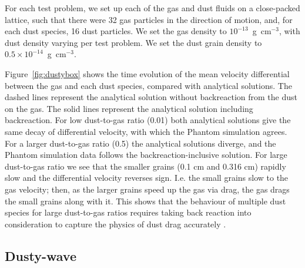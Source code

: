 \documentclass[fleqn,usenatbib]{mnras}
\begin{document}
For each test problem, we set up each of the gas and dust fluids on a
close-packed lattice, such that there were 32 gas particles in the direction of
motion, and, for each dust species, 16 dust particles. We set the gas density to
\(10^{-13}\)~g~cm\({}^{-3}\), with dust density varying per test problem. We set
the dust grain density to \(0.5 \times 10^{-14}\)~g~cm\({}^{-3}\).

Figure~\ref{fig:dustybox} shows the time evolution of the mean velocity
differential between the gas and each dust species, compared with analytical
solutions. The dashed lines represent the analytical solution without
backreaction from the dust on the gas. The solid lines represent the analytical
solution including backreaction. For low dust-to-gas ratio (0.01) both
analytical solutions give the same decay of differential velocity, with which
the Phantom simulation agrees. For a larger dust-to-gas ratio (0.5) the
analytical solutions diverge, and the Phantom simulation data follows the
backreaction-inclusive solution. For large dust-to-gas ratio we see that the
smaller grains (0.1 cm and 0.316 cm) rapidly slow and the differential velocity
reverses sign. I.e. the small grains slow to the gas velocity; then, as the
larger grains speed up the gas via drag, the gas drags the small grains along
with it. This shows that the behaviour of multiple dust species for large
dust-to-gas ratios requires taking back reaction into consideration to capture
the physics of dust drag accurately
\citep{Gonzalez2017MNRAS.467.1984G,Dipierro2018MNRAS.479.4187D}.

\subsection{Dusty-wave}
\end{document}
